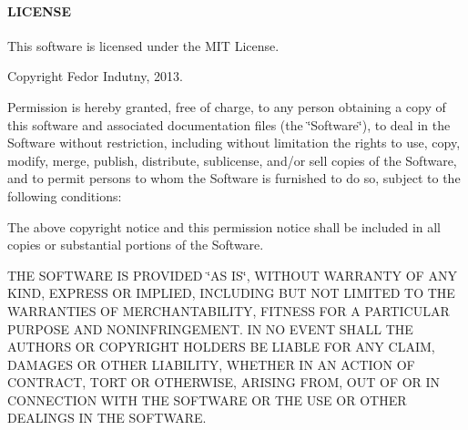 \paragraph*{L\+I\+C\+E\+N\+SE}

This software is licensed under the M\+IT License.

Copyright Fedor Indutny, 2013.

Permission is hereby granted, free of charge, to any person obtaining a copy of this software and associated documentation files (the \char`\"{}\+Software\char`\"{}), to deal in the Software without restriction, including without limitation the rights to use, copy, modify, merge, publish, distribute, sublicense, and/or sell copies of the Software, and to permit persons to whom the Software is furnished to do so, subject to the following conditions\+:

The above copyright notice and this permission notice shall be included in all copies or substantial portions of the Software.

T\+HE S\+O\+F\+T\+W\+A\+RE IS P\+R\+O\+V\+I\+D\+ED \char`\"{}\+A\+S I\+S\char`\"{}, W\+I\+T\+H\+O\+UT W\+A\+R\+R\+A\+N\+TY OF A\+NY K\+I\+ND, E\+X\+P\+R\+E\+SS OR I\+M\+P\+L\+I\+ED, I\+N\+C\+L\+U\+D\+I\+NG B\+UT N\+OT L\+I\+M\+I\+T\+ED TO T\+HE W\+A\+R\+R\+A\+N\+T\+I\+ES OF M\+E\+R\+C\+H\+A\+N\+T\+A\+B\+I\+L\+I\+TY, F\+I\+T\+N\+E\+SS F\+OR A P\+A\+R\+T\+I\+C\+U\+L\+AR P\+U\+R\+P\+O\+SE A\+ND N\+O\+N\+I\+N\+F\+R\+I\+N\+G\+E\+M\+E\+NT. IN NO E\+V\+E\+NT S\+H\+A\+LL T\+HE A\+U\+T\+H\+O\+RS OR C\+O\+P\+Y\+R\+I\+G\+HT H\+O\+L\+D\+E\+RS BE L\+I\+A\+B\+LE F\+OR A\+NY C\+L\+A\+IM, D\+A\+M\+A\+G\+ES OR O\+T\+H\+ER L\+I\+A\+B\+I\+L\+I\+TY, W\+H\+E\+T\+H\+ER IN AN A\+C\+T\+I\+ON OF C\+O\+N\+T\+R\+A\+CT, T\+O\+RT OR O\+T\+H\+E\+R\+W\+I\+SE, A\+R\+I\+S\+I\+NG F\+R\+OM, O\+UT OF OR IN C\+O\+N\+N\+E\+C\+T\+I\+ON W\+I\+TH T\+HE S\+O\+F\+T\+W\+A\+RE OR T\+HE U\+SE OR O\+T\+H\+ER D\+E\+A\+L\+I\+N\+GS IN T\+HE S\+O\+F\+T\+W\+A\+RE. 